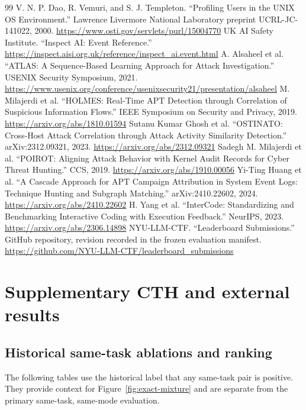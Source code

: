 \documentclass[10pt]{article}
\begin{document}
\begin{thebibliography}{99}
 V. N. P. Dao, R. Vemuri, and S. J. Templeton. ``Profiling Users in the UNIX OS Environment.'' Lawrence Livermore National Laboratory preprint UCRL-JC-141022, 2000. \url{https://www.osti.gov/servlets/purl/15004770}
 UK AI Safety Institute. ``Inspect AI: Event Reference.'' \url{https://inspect.aisi.org.uk/reference/inspect_ai.event.html}
 A. Alsaheel et al. ``ATLAS: A Sequence-Based Learning Approach for Attack Investigation.'' USENIX Security Symposium, 2021. \url{https://www.usenix.org/conference/usenixsecurity21/presentation/alsaheel}
 M. Milajerdi et al. ``HOLMES: Real-Time APT Detection through Correlation of Suspicious Information Flows.'' IEEE Symposium on Security and Privacy, 2019. \url{https://arxiv.org/abs/1810.01594}
 Sutanu Kumar Ghosh et al. ``OSTINATO: Cross-Host Attack Correlation through Attack Activity Similarity Detection.'' arXiv:2312.09321, 2023. \url{https://arxiv.org/abs/2312.09321}
 Sadegh M. Milajerdi et al. ``POIROT: Aligning Attack Behavior with Kernel Audit Records for Cyber Threat Hunting.'' CCS, 2019. \url{https://arxiv.org/abs/1910.00056}
 Yi-Ting Huang et al. ``A Cascade Approach for APT Campaign Attribution in System Event Logs: Technique Hunting and Subgraph Matching.'' arXiv:2410.22602, 2024. \url{https://arxiv.org/abs/2410.22602}
 H. Yang et al. ``InterCode: Standardizing and Benchmarking Interactive Coding with Execution Feedback.'' NeurIPS, 2023. \url{https://arxiv.org/abs/2306.14898}
 NYU-LLM-CTF. ``Leaderboard Submissions.'' GitHub repository, revision recorded in the frozen evaluation manifest. \url{https://github.com/NYU-LLM-CTF/leaderboard_submissions}
\end{thebibliography}

\clearpage
\appendix
\section{Supplementary CTH and external results}\label{app:legacy-results}

\subsection{Historical same-task ablations and ranking}
The following tables use the historical label that any same-task pair is positive. They provide context for Figure~\ref{fig:exact-mixture} and are separate from the primary same-task, same-mode evaluation.
\end{document}
